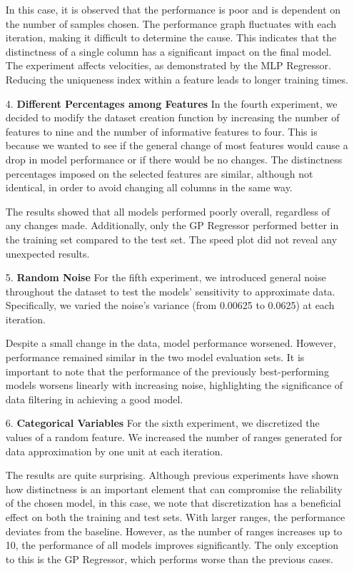 \documentclass{Configuration_Files/PoliMi3i_thesis}
\begin{document}
\begin{enumerate}
 In this case, it is observed that the performance is poor and is dependent on the number of samples chosen. The performance graph fluctuates with each iteration, making it difficult to determine the cause. This indicates that the distinctness of a single column has a significant impact on the final model. The experiment affects velocities, as demonstrated by the MLP Regressor. Reducing the uniqueness index within a feature leads to longer training times.

\item[4.] \textbf{Different Percentages among Features}
In the fourth experiment, we decided to modify the dataset creation function by increasing the number of features to nine and the number of informative features to four. This is because we wanted to see if the general change of most features would cause a drop in model performance or if there would be no changes. The distinctness percentages imposed on the selected features are similar, although not identical, in order to avoid changing all columns in the same way.

The results showed that all models performed poorly overall, regardless of any changes made. Additionally, only the GP Regressor performed better in the training set compared to the test set. The speed plot did not reveal any unexpected results.

\item[5.] \textbf{Random Noise}
For the fifth experiment, we introduced general noise throughout the dataset to test the models' sensitivity to approximate data. Specifically, we varied the noise's variance (from 0.00625 to 0.0625) at each iteration.

Despite a small change in the data, model performance worsened. However, performance remained similar in the two model evaluation sets. It is important to note that the performance of the previously best-performing models worsens linearly with increasing noise, highlighting the significance of data filtering in achieving a good model.

\item[6.] \textbf{Categorical Variables}
For the sixth experiment, we discretized the values of a random feature. We increased the number of ranges generated for data approximation by one unit at each iteration.

The results are quite surprising. Although previous experiments have shown how distinctness is an important element that can compromise the reliability of the chosen model, in this case, we note that discretization has a beneficial effect on both the training and test sets. With larger ranges, the performance deviates from the baseline. However, as the number of ranges increases up to 10, the performance of all models improves significantly. The only exception to this is the GP Regressor, which performs worse than the previous cases.


\end{enumerate}
\end{document}

